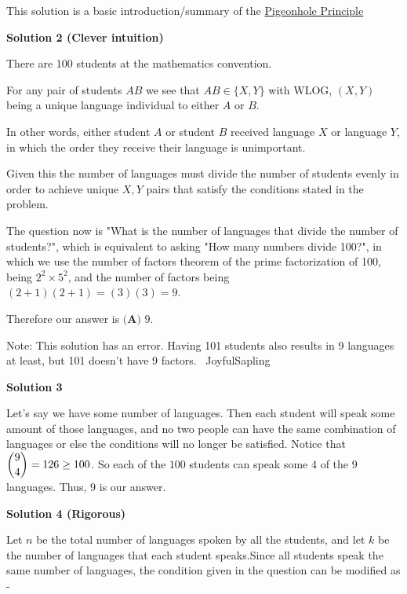 \begin{enumerate}
 This solution is a basic introduction/summary of the \href{https://artofproblemsolving.com/wiki/index.php?title=Pigeonhole\_Principle}{Pigeonhole Principle}

 



\textbf{Solution 2 (Clever intuition)}

There are 100 students at the mathematics convention.

 For any pair of students $AB$ we see that $AB \in \{X,Y\}$ with WLOG, $(X, Y)$ being a unique language individual to either $A$ or $B$.

 In other words, either student $A$ or student $B$ received language $X$ or language $Y$, in which the order they receive their language is unimportant. 

 Given this the number of languages must divide the number of students evenly in order to achieve unique $X,Y$ pairs that satisfy the conditions stated in the problem.

 The question now is "What is the number of languages that divide the number of students?", which is equivalent to asking "How many numbers divide 100?", in which we use the number of factors theorem of the prime factorization of 100, being $2^2 \times 5^2$, and the number of factors being $(2+1)(2+1) = (3)(3) = 9$.

 Therefore our answer is $\boxed{\textbf{(A) } 9}$.

 Note: This solution has an error. Having 101 students also results in 9 languages at least, but 101 doesn't have 9 factors. ~JoyfulSapling

 



\textbf{Solution 3}

Let's say we have some number of languages. Then each student will speak some amount of those languages, and no two people can have the same combination of languages or else the conditions will no longer be satisfied. Notice that $\dbinom94=126\geq100$. So each of the $100$ students can speak some $4$ of the $9$ languages. Thus, $\boxed{9}$ is our answer.

 



\textbf{Solution 4 (Rigorous)}

Let $n$ be the total number of languages spoken by all the students, and let $k$ be the number of languages that each student speaks.Since all students speak the same number of languages, the condition given in the question can be modified as -


\end{enumerate}
